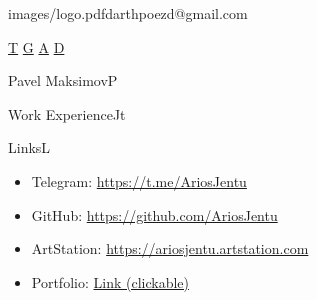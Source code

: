 \documentclass[10pt]{extarticle}
\begin{document}
	
	\init

	\begin{sidebar}{images/logo.pdf}{darthpoezd@gmail.com}

		\hfill
		{
			\iconsfont\fontsize{20}{18}\selectfont
			\href{https://t.me/AriosJentu}{T}
			\href{https://github.com/AriosJentu}{G}
			\href{https://AriosJentu.artstation.com/}{A}
			\href{https://drive.google.com/drive/folders/1hcmudyfBtrOo7_3qARUckmqdiUvxr0jT?usp=drive_link}{D}
		}








	\end{sidebar}

	\begin{centralpart}{Pavel Maksimov}{P}{}
		\aboutdesign
	\end{centralpart}

	\UpdatePosition
	
	\begin{centralpart}{Work Experience}{J}{t}
		
		\weteacher

		\weenvironment

	\end{centralpart}

	\BottomSignature

	\NewPage
	\ApplyNoSideBar
	\DrawSimpleSideBar

	\CentralEducation

	\UpdatePosition
	\begin{centralpart}{Links}{L}{}
		\begin{titleblock}{}{}{}{}
			\vspace*{-25pt}
			\begin{itemize}[label=$\circ$]
				\item Telegram: {\color{sidetopsep}\href{https://t.me/AriosJentu}{https://t.me/AriosJentu}} \vp
				\item GitHub: {\color{sidetopsep}\href{https://github.com/AriosJentu}{https://github.com/AriosJentu}} \vp
				\item ArtStation: {\color{sidetopsep}\href{https://AriosJentu.artstation.com/}{https://ariosjentu.artstation.com}} \vp
				\item Portfolio: {\color{sidetopsep}\href{https://drive.google.com/drive/folders/1hcmudyfBtrOo7_3qARUckmqdiUvxr0jT?usp=drive_link}{Link (clickable)}} \vp
			\end{itemize}
		\end{titleblock}
	\end{centralpart}

	\UpdatePosition

	\CentralWishes
	
	\BottomSignature
\end{document}
